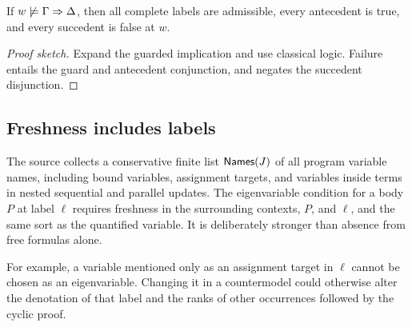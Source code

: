 \begin{lemma}\label{lem:false-sequent}
If $w\not\models\Gamma\Rightarrow \Delta$, then all complete labels are admissible,
every antecedent is true, and every succedent is false at $w$.
\end{lemma}
\begin{proof}[Proof sketch]
Expand the guarded implication and use classical logic. Failure entails
the guard and antecedent conjunction, and negates the succedent disjunction.
\end{proof}

\subsection{Freshness includes labels}
The source collects a conservative finite list $\mathsf{Names}(J)$ of all program
variable names, including bound variables, assignment targets, and variables
inside terms in nested sequential and parallel updates. The eigenvariable
condition for a body $P$ at label $\ell$ requires freshness in the surrounding
contexts, $P$, and $\ell$, and the same sort as the quantified variable.
It is deliberately stronger than absence from free formulas alone.

For example, a variable mentioned only as an assignment target in $\ell$
cannot be chosen as an eigenvariable. Changing it in a countermodel could
otherwise alter the denotation of that label and the ranks of other
occurrences followed by the cyclic proof.
